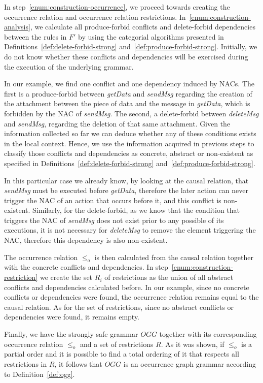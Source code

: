 In step~\ref{enum:construction-occurrence}, we proceed towards creating the occurrence relation and occurrence relation restrictions. 
  In~\ref{enum:construction-analysis}, we calculate all produce-forbid conflicts and delete-forbid dependencies between the rules in $F'$ by using the categorial algorithms presented in Definitions~\ref{def:delete-forbid-strong} and~\ref{def:produce-forbid-strong}. 
  Initially, we do not know whether these conflicts and dependencies will be exercised during the execution of the underlying grammar. 

  In our example, we find one conflict and one dependency induced by NACs. The first is a produce-forbid between \emph{getData} and \emph{sendMsg} regarding the creation of the attachment between the piece of data and the message in \emph{getData}, which is forbidden by the NAC of \emph{sendMsg}.
  The second, a delete-forbid between \emph{deleteMsg} and \emph{sendMsg}, regarding the deletion of that same attachment.
  Given the information collected so far we can deduce whether any of these
conditions exists in the local context.
  Hence, we use the information acquired in previous steps to classify those conflicts and dependencies as concrete, abstract or non-existent as specified in
Definitions~\ref{def:delete-forbid-strong} and~\ref{def:produce-forbid-strong}. 

In this particular case we already know, by looking at the causal relation, that \emph{sendMsg} must be executed before \emph{getData}, therefore the later action can never trigger the NAC of an action that occurs before it, and this conflict is non-existent. Similarly, for the delete-forbid, as we know that the condition that triggers the NAC of \emph{sendMsg} does not exist prior to any possible of its executions, it is not necessary for \emph{deleteMsg} to remove the element triggering the NAC, therefore this dependency is also non-existent.

The occurrence relation $\leq_o$ is then calculated from the causal relation together with the concrete conflicts and dependencies. In step~\ref{enum:construction-restriction} we create the set $R_i$ of restrictions as the union of all abstract conflicts and dependencies calculated before. In our example, since no concrete conflicts or dependencies were found, the occurrence relation remains equal to the causal relation. As for the set of restrictions, since no abstract conflicts or dependencies
were found, it remains empty.

Finally, we have the strongly safe grammar $OGG$ together with its corresponding occurrence relation $\leq_o$ and a set of restrictions $R$. As it was shown, if $\leq_o$ is a partial order and it is possible to find a total ordering of it that respects all restrictions in $R$, it follows that $OGG$ is an occurrence graph grammar according to Definition~\ref{def:ogg}.


